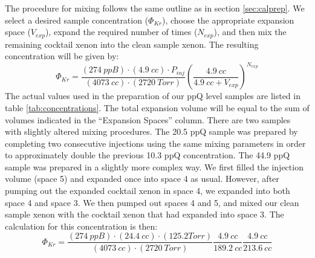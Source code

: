\documentclass[12pt]{article}
\begin{document}
The procedure for mixing follows the same outline as in section \ref{sec:calprep}. We select a desired sample concentration ($\Phi_{Kr}$), choose the appropriate expansion space ($V_{exp}$), expand the required number of times ($N_{exp}$), and then mix the remaining cocktail xenon into the clean sample xenon. The resulting concentration will be given by:
\begin{equation}
\Phi_{Kr}=\frac{(274 \ ppB)\cdot (4.9 \ cc)\cdot P_{inj}}{(4073 \ cc)\cdot (2720 \ Torr)}\left(\frac{4.9 \ cc}{4.9 \ cc + V_{exp}}\right)^{N_{exp}}
\end{equation}
The actual values used in the preparation of our ppQ level samples are listed in table \ref{tab:concentrations}. The total expansion volume will be equal to the sum of volumes indicated in the ``Expansion Spaces'' column. There are two samples with slightly altered mixing procedures. The 20.5 ppQ sample was prepared by completing two consecutive injections using the same mixing parameters in order to approximately double the previous 10.3 ppQ concentration. The 44.9 ppQ sample was prepared in a slightly more complex way. We first filled the injection volume (space 5) and expanded once into space 4 as usual. However, after pumping out the expanded cocktail xenon in space 4, we expanded into both space 4 and space 3. We then pumped out spaces 4 and 5, and mixed our clean sample xenon with the cocktail xenon that had expanded into space 3. The calculation for this concentration is then:
\begin{equation}
\Phi_{Kr}=\frac{(274 \ ppB)\cdot ( 24.4 \ cc)\cdot (125.2 Torr)}{(4073 \ cc)\cdot (2720 \ Torr)}\frac{4.9 \ cc}{189.2 \ cc }\frac{4.9 \ cc}{213.6 \ cc }
\end{equation}
\end{document}
